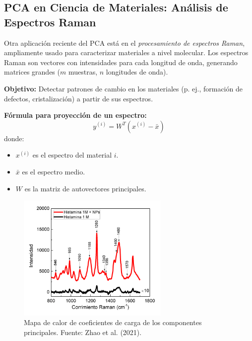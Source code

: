 \documentclass[12pt]{article}
\begin{document}
        \subsection*{PCA en Ciencia de Materiales: Análisis de Espectros Raman}
        \noindent
        Otra aplicación reciente del PCA está en el \emph{procesamiento de espectros Raman}, ampliamente usado para caracterizar materiales a nivel molecular. Los espectros Raman son vectores con intensidades para cada longitud de onda, generando matrices grandes ($ m $ muestras, $ n $ longitudes de onda).
        
        \noindent
        \textbf{Objetivo:} Detectar patrones de cambio en los materiales (p. ej., formación de defectos, cristalización) a partir de sus espectros.
        
        \vspace{1em}
        \noindent
        \textbf{Fórmula para proyección de un espectro:}
        \[
        y^{(i)} = W^T (x^{(i)} - \bar{x})
        \]
        donde:
        \begin{itemize}
                \item $ x^{(i)} $ es el espectro del material $ i $.
                \item $ \bar{x} $ es el espectro medio.
                \item $ W $ es la matriz de autovectores principales.
        \end{itemize}
        
        \vspace{1em}
        \noindent

        \begin{figure}[H]
                \centering
                \includegraphics[width=0.65\textwidth]{imagenes/pca_raman_heatmap.png}
                \caption{Mapa de calor de coeficientes de carga de los componentes principales. Fuente: Zhao et al. (2021).}
                \label{fig:Imagen5}
        \end{figure}
        
\end{document}
